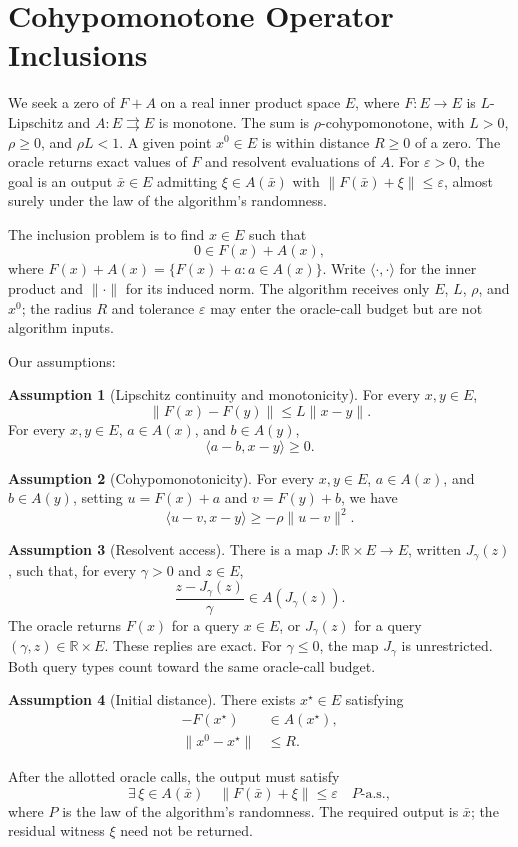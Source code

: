 \documentclass[10pt]{article}
\theoremstyle{definition}
\newtheorem{assumption}{Assumption}
\begin{document}
\section*{Cohypomonotone Operator Inclusions}
We seek a zero of $F+A$ on a real inner product space $E$, where $F:E\to E$ is $L$-Lipschitz and $A:E\rightrightarrows E$ is monotone. The sum is $\rho$-cohypomonotone, with $L>0$, $\rho\geq0$, and $\rho L<1$. A given point $x^0\in E$ is within distance $R\geq0$ of a zero. The oracle returns exact values of $F$ and resolvent evaluations of $A$. For $\varepsilon>0$, the goal is an output $\bar{x}\in E$ admitting $\xi\in A(\bar{x})$ with $\|F(\bar{x})+\xi\|\leq\varepsilon$, almost surely under the law of the algorithm's randomness.

The inclusion problem is to find $x\in E$ such that
\[
0\in F(x)+A(x),
\]
where $F(x)+A(x)=\{F(x)+a:a\in A(x)\}$. Write $\langle\cdot,\cdot\rangle$ for the inner product and $\|\cdot\|$ for its induced norm. The algorithm receives only $E$, $L$, $\rho$, and $x^0$; the radius $R$ and tolerance $\varepsilon$ may enter the oracle-call budget but are not algorithm inputs.

Our assumptions:
\begin{assumption}[Lipschitz continuity and monotonicity]
For every $x,y\in E$,
\[
\|F(x)-F(y)\|\leq L\|x-y\|.
\]
For every $x,y\in E$, $a\in A(x)$, and $b\in A(y)$,
\[
\langle a-b,x-y\rangle\geq0.
\]
\end{assumption}

\begin{assumption}[Cohypomonotonicity]
For every $x,y\in E$, $a\in A(x)$, and $b\in A(y)$, setting $u=F(x)+a$ and $v=F(y)+b$, we have
\[
\langle u-v,x-y\rangle\geq-\rho\|u-v\|^2.
\]
\end{assumption}

\begin{assumption}[Resolvent access]
There is a map $J:\mathbb{R}\times E\to E$, written $J_\gamma(z)$, such that, for every $\gamma>0$ and $z\in E$,
\[
\frac{z-J_\gamma(z)}{\gamma}\in A(J_\gamma(z)).
\]
The oracle returns $F(x)$ for a query $x\in E$, or $J_\gamma(z)$ for a query $(\gamma,z)\in\mathbb{R}\times E$. These replies are exact. For $\gamma\leq0$, the map $J_\gamma$ is unrestricted. Both query types count toward the same oracle-call budget.
\end{assumption}

\begin{assumption}[Initial distance]
There exists $x^\star\in E$ satisfying
\[
\begin{aligned}
-F(x^\star)&\in A(x^\star),\\
\|x^0-x^\star\|&\leq R.
\end{aligned}
\]
\end{assumption}

After the allotted oracle calls, the output must satisfy
\[
\exists\,\xi\in A(\bar{x})\quad
\|F(\bar{x})+\xi\|\leq\varepsilon
\quad P\text{-a.s.},
\]
where $P$ is the law of the algorithm's randomness. The required output is $\bar{x}$; the residual witness $\xi$ need not be returned.
\end{document}
